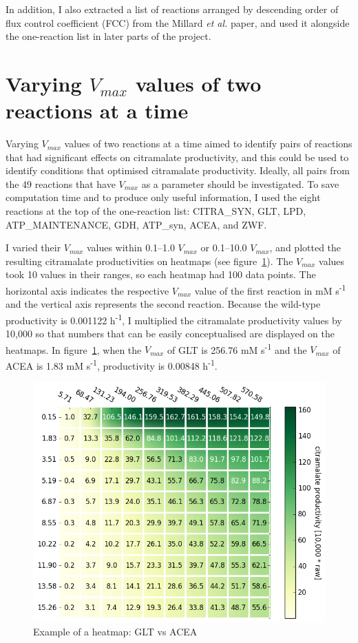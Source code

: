 \documentclass[parskip=full, numbers=noenddot]{scrreprt}
\begin{document}
In addition, I also extracted a list of reactions arranged by descending order of flux control coefficient (FCC) from the Millard \emph{et al.} paper, and used it alongside the one-reaction list in later parts of the project.

\section{Varying $V_{max}$ values of two reactions at a time}
\label{sec:couples}

Varying $V_{max}$ values of two reactions at a time aimed to identify pairs of reactions that had significant effects on citramalate productivity, and this could be used to identify conditions that optimised citramalate productivity. Ideally, all pairs from the 49 reactions that have $V_{max}$ as a parameter should be investigated. To save computation time and to produce only useful information, I used the eight reactions at the top of the one-reaction list: CITRA\_SYN, GLT, LPD, ATP\_MAINTENANCE, GDH, ATP\_syn, ACEA, and ZWF.

I varied their $V_{max}$ values within 0.1--1.0 $V_{max}$ or 0.1--10.0 $V_{max}$, and plotted the resulting citramalate productivities on heatmaps (see figure~\ref{fig:heatmapsample}). The $V_{max}$ values took 10 values in their ranges, so each heatmap had 100 data points. The horizontal axis indicates the respective $V_{max}$ value of the first reaction in mM s\textsuperscript{-1} and the vertical axis represents the second reaction. Because the wild-type productivity is 0.001122 h\textsuperscript{-1}, I multiplied the citramalate productivity values by 10,000 so that numbers that can be easily conceptualised are displayed on the heatmaps. In figure~\ref{fig:heatmapsample}, when the $V_{max}$ of GLT is 256.76 mM s\textsuperscript{-1} and the $V_{max}$ of ACEA is 1.83 mM s\textsuperscript{-1}, productivity is 0.00848 h\textsuperscript{-1}.

\begin{figure}[hbp]
  \centering
  \includegraphics[scale=0.5]{heatmapsample}
  \caption{Example of a heatmap: GLT vs ACEA}
  \label{fig:heatmapsample}
\end{figure}
\end{document}
